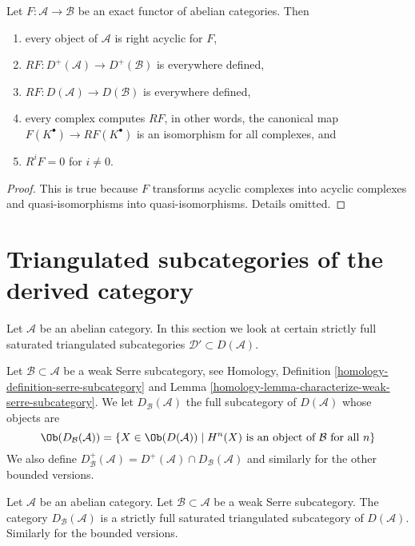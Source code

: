 \begin{lemma}
\label{lemma-right-derived-exact-functor}
Let $F : \mathcal{A} \to \mathcal{B}$ be an exact functor of
abelian categories. Then
\begin{enumerate}
\item every object of $\mathcal{A}$ is right acyclic for $F$,
\item $RF : D^{+}(\mathcal{A}) \to D^{+}(\mathcal{B})$ is everywhere defined,
\item $RF : D(\mathcal{A}) \to D(\mathcal{B})$ is everywhere defined,
\item every complex computes $RF$, in other words, the canonical
map $F(K^\bullet) \to RF(K^\bullet)$ is an isomorphism for all complexes, and
\item $R^iF = 0$ for $i \not = 0$.
\end{enumerate}
\end{lemma}

\begin{proof}
This is true because $F$ transforms acyclic complexes into acyclic complexes
and quasi-isomorphisms into quasi-isomorphisms. Details omitted.
\end{proof}









\section{Triangulated subcategories of the derived category}
\label{section-triangulated-sub}

\noindent
Let $\mathcal{A}$ be an abelian category. In this section we look at
certain strictly full saturated triangulated subcategories
$\mathcal{D}' \subset D(\mathcal{A})$.

\medskip\noindent
Let $\mathcal{B} \subset \mathcal{A}$ be a weak Serre subcategory, see
Homology, Definition \ref{homology-definition-serre-subcategory} and
Lemma \ref{homology-lemma-characterize-weak-serre-subcategory}.
We let $D_\mathcal{B}(\mathcal{A})$ the full subcategory of
$D(\mathcal{A})$ whose objects are
$$
\Ob(D_\mathcal{B}(\mathcal{A}))
=
\{X \in \Ob(D(\mathcal{A})) \mid
H^n(X) \text{ is an object of }\mathcal{B}\text{ for all }n\}
$$
We also define
$D^{+}_\mathcal{B}(\mathcal{A}) =
D^{+}(\mathcal{A}) \cap D_\mathcal{B}(\mathcal{A})$
and similarly for the other bounded versions.

\begin{lemma}
\label{lemma-cohomology-in-serre-subcategory}
Let $\mathcal{A}$ be an abelian category.
Let $\mathcal{B} \subset \mathcal{A}$ be a weak Serre subcategory.
The category $D_\mathcal{B}(\mathcal{A})$ is a strictly full
saturated triangulated subcategory of $D(\mathcal{A})$.
Similarly for the bounded versions.
\end{lemma}

